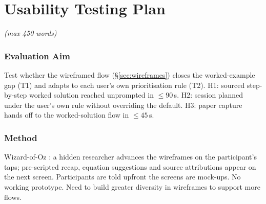 \documentclass[a4paper,11pt]{article}
\newcommand{\wclimit}[1]{\hfill\textit{\footnotesize(max #1 words)}}
\begin{document}

\newpage
\section{Usability Testing Plan}\label{sec:usability}
\wclimit{450}

\subsubsection*{Evaluation Aim}
Test whether the wireframed flow (\S\ref{sec:wireframes}) closes the
worked-example gap (T1) and adapts to each user's own prioritisation
rule (T2). H1: sourced step-by-step worked solution reached
unprompted in ${\leq}90$\,s. H2: session planned under the user's own
rule without overriding the default. H3: paper capture hands off to
the worked-solution flow in ${\leq}45$\,s.

\subsubsection*{Method}
Wizard-of-Oz \parencite{kelley1984}: a hidden researcher advances
the wireframes on the participant's taps; pre-scripted recap,
equation suggestions and source attributions appear on the next
screen. Participants are told upfront the screens are mock-ups. No
working prototype. Need to build greater diversity in wireframes to support more flows.
\end{document}
